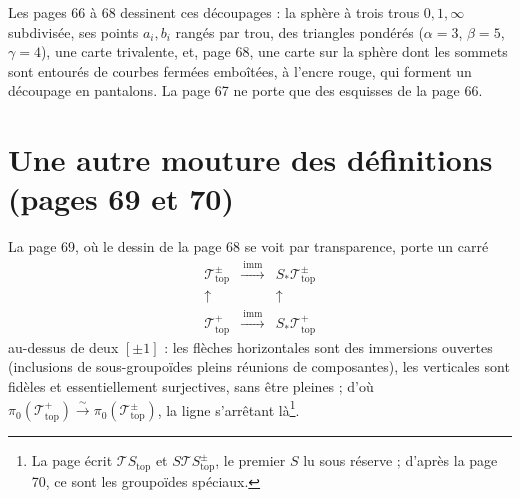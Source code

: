 \documentclass[11pt,a4paper]{article}
\begin{document}
Les pages 66 à 68 dessinent ces découpages : la sphère à trois trous $0, 1,
\infty$ subdivisée, ses points $a_i, b_i$ rangés par trou, des triangles
pondérés ($\alpha = 3$, $\beta = 5$, $\gamma = 4$), une carte trivalente, et,
page 68, une carte sur la sphère dont les sommets sont entourés de courbes
fermées emboîtées, à l'encre rouge, qui forment un découpage en pantalons. La page 67 ne
porte que des esquisses de la page 66.

\section*{Une autre mouture des définitions (pages 69 et 70)}

La page 69, où le dessin de la page 68 se voit par transparence, porte
un carré
\[
\begin{array}{ccc}
\mathcal{T}^{\pm}_{\mathrm{top}} & \xrightarrow{\ \mathrm{imm}\ } &
S_{*}\mathcal{T}^{\pm}_{\mathrm{top}} \\
\uparrow & & \uparrow \\
\mathcal{T}^{+}_{\mathrm{top}} & \xrightarrow{\ \mathrm{imm}\ } &
S_{*}\mathcal{T}^{+}_{\mathrm{top}}
\end{array}
\]
au-dessus de deux $[\pm 1]$ : les flèches horizontales sont des immersions
ouvertes (inclusions de sous-groupoïdes pleins réunions de composantes), les
verticales sont fidèles et essentiellement surjectives, sans être pleines ; d'où
$\pi_0(\mathcal{T}^{+}_{\mathrm{top}}) \xrightarrow{\sim}
\pi_0(\mathcal{T}^{\pm}_{\mathrm{top}})$, la ligne s'arrêtant là\footnote{La page
écrit $\mathcal{T}S_{\mathrm{top}}$ et $S\mathcal{T}S^{\pm}_{\mathrm{top}}$, le
premier $S$ lu sous réserve ; d'après la page 70, ce sont les groupoïdes
spéciaux.}.
\end{document}
